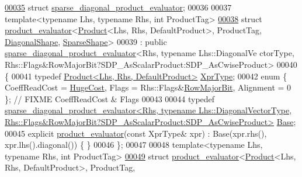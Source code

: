 \begin{DoxyCode}
\hyperlink{struct_eigen_1_1internal_1_1sparse__diagonal__product__evaluator}{00035} \textcolor{keyword}{struct }\hyperlink{struct_eigen_1_1internal_1_1sparse__diagonal__product__evaluator}{sparse\_diagonal\_product\_evaluator};
00036 
00037 \textcolor{keyword}{template}<\textcolor{keyword}{typename} Lhs, \textcolor{keyword}{typename} Rhs, \textcolor{keywordtype}{int} ProductTag>
\hyperlink{struct_eigen_1_1internal_1_1product__evaluator_3_01_product_3_01_lhs_00_01_rhs_00_01_default_pro850b56c5eb8e297547f40d125e705127}{00038} \textcolor{keyword}{struct }\hyperlink{struct_eigen_1_1internal_1_1product__evaluator}{product\_evaluator}<\hyperlink{group___core___module_class_eigen_1_1_product}{Product}<Lhs, Rhs, DefaultProduct>, ProductTag, 
      \hyperlink{struct_eigen_1_1_diagonal_shape}{DiagonalShape}, \hyperlink{struct_eigen_1_1_sparse_shape}{SparseShape}>
00039   : \textcolor{keyword}{public} \hyperlink{struct_eigen_1_1internal_1_1sparse__diagonal__product__evaluator}{sparse\_diagonal\_product\_evaluator}<Rhs, typename Lhs::DiagonalVe
      ctorType, Rhs::Flags&RowMajorBit?SDP\_AsScalarProduct:SDP\_AsCwiseProduct>
00040 \{
00041   \textcolor{keyword}{typedef} \hyperlink{group___core___module_class_eigen_1_1_product}{Product<Lhs, Rhs, DefaultProduct>} 
      \hyperlink{group___core___module_class_eigen_1_1_product}{XprType};
00042   \textcolor{keyword}{enum} \{ CoeffReadCost = \hyperlink{namespace_eigen_a3163430a1c13173faffde69016b48aaf}{HugeCost}, Flags = Rhs::Flags&\hyperlink{group__flags_gae4f56c2a60bbe4bd2e44c5b19cbe8762}{RowMajorBit}, Alignment = 0 \}; \textcolor{comment}{//
       FIXME CoeffReadCost & Flags}
00043   
00044   \textcolor{keyword}{typedef} 
      \hyperlink{struct_eigen_1_1internal_1_1sparse__diagonal__product__evaluator}{sparse\_diagonal\_product\_evaluator<Rhs, typename Lhs::DiagonalVectorType,
       Rhs::Flags&RowMajorBit?SDP\_AsScalarProduct:SDP\_AsCwiseProduct>}
       \hyperlink{struct_eigen_1_1internal_1_1sparse__diagonal__product__evaluator}{Base};
00045   \textcolor{keyword}{explicit} \hyperlink{struct_eigen_1_1internal_1_1product__evaluator}{product\_evaluator}(\textcolor{keyword}{const} XprType& xpr) : Base(xpr.rhs(), xpr.lhs().diagonal()) \{
      \}
00046 \};
00047 
00048 \textcolor{keyword}{template}<\textcolor{keyword}{typename} Lhs, \textcolor{keyword}{typename} Rhs, \textcolor{keywordtype}{int} ProductTag>
\hyperlink{struct_eigen_1_1internal_1_1product__evaluator_3_01_product_3_01_lhs_00_01_rhs_00_01_default_prod80b2bd6031901e266d576d7eb3e9735}{00049} \textcolor{keyword}{struct }\hyperlink{struct_eigen_1_1internal_1_1product__evaluator}{product\_evaluator}<\hyperlink{group___core___module_class_eigen_1_1_product}{Product}<Lhs, Rhs, DefaultProduct>, ProductTag, 

\end{DoxyCode}
